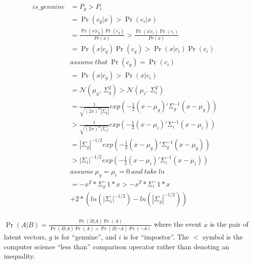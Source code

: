 \begin{align*}
is\_genuine & = P_g > P_i&\\
        & = \Pr(c_g|x) > \Pr(c_i|x)&\\
        & = \frac{\Pr(x|c_g)\Pr(c_g)}{Pr(x)} > \frac{\Pr(x|c_i)\Pr(c_i)}{Pr(x)}&\\
        & = \Pr(x|c_g)\Pr(c_g) > \Pr(x|c_i)\Pr(c_i)&\\
        & assume\ that\ \Pr(c_g) = \Pr(c_i)&\\ %
        & = \Pr(x|c_g) > \Pr(x|c_i)&\\
        & = \mathcal{N}(\mu_g,\,\Sigma_g^{2}) > \mathcal{N}(\mu_i,\,\Sigma_i^{2})&\\
        & = \frac{1}{\sqrt{(2\pi)^{n}|\Sigma_g|}}exp(-\frac{1}{2}(x-\mu_g)'\Sigma_g^{-1}(x-\mu_g))&\\
        & > \frac{1}{\sqrt{(2\pi)^{n}|\Sigma_i|}}exp(-\frac{1}{2}(x-\mu_i)'\Sigma_i^{-1}(x-\mu_i))&\\
        & = |\Sigma_g|^{-1/2}exp(-\frac{1}{2}(x-\mu_g)'\Sigma_g^{-1}(x-\mu_g))&\\
        & > |\Sigma_i|^{-1/2}exp(-\frac{1}{2}(x-\mu_i)'\Sigma_i^{-1}(x-\mu_i))&\\
        & assume\ \mu_g = \mu_i = 0\ and\ take\ ln&\\
        & = -x^T * \Sigma_g^-1 * x > -x^T * \Sigma_i^-1 * x &\\
        &    + 2 * (ln(|\Sigma_i|^{-1/2}) - ln(|\Sigma_g|^{-1/2}))&\\
\end{align*}

$\Pr(A|B)=\frac{\Pr(B|A)\Pr(A)}{\Pr(B|A)\Pr(A)+\Pr(B|\neg A)\Pr(\neg A)}$
where the event $x$ is the pair of latent vectors, $g$ is for ``genuine'', and $i$ is for ``impostor''.
The $<$ symbol is the computer science ``less than'' comparison operator rather than denoting an inequality.

